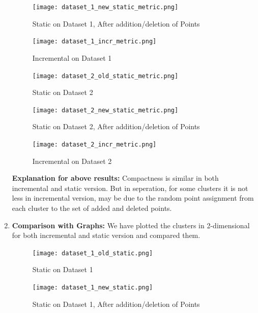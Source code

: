 \documentclass[acmsmall]{acmart}
\begin{document}
\begin{enumerate}
        \begin{figure} [H]
            \texttt{[image: dataset\_1\_new\_static\_metric.png]}
            \caption{Static on Dataset 1, After addition/deletion of Points} 
        \end{figure}
                    
        \begin{figure} [H]
            \texttt{[image: dataset\_1\_incr\_metric.png]}
            \caption{Incremental on Dataset 1} 
        \end{figure}
                    
        \begin{figure} [H]
            \texttt{[image: dataset\_2\_old\_static\_metric.png]}
            \caption{Static on Dataset 2} 
        \end{figure}
                    
        \begin{figure} [H]
            \texttt{[image: dataset\_2\_new\_static\_metric.png]}
            \caption{Static on Dataset 2, After addition/deletion of Points} 
        \end{figure}
        
        \begin{figure} [H]
            \texttt{[image: dataset\_2\_incr\_metric.png]}
            \caption{Incremental on Dataset 2} 
        \end{figure}
                    
        \textbf{Explanation for above results: } Compactness is similar in both incremental and static version. But in seperation, for some clusters it is not less in incremental version, may be due to the random point assignment from each cluster to the set of added and deleted points. 
        \vspace{2pt}
            
        \item \textbf{Comparison with Graphs: }We have plotted the clusters in 2-dimensional for both incremental and static version and compared them.
        \vspace{-20mm}
            \begin{figure} [H]
                \texttt{[image: dataset\_1\_old\_static.png]}
                \caption{Static on Dataset 1} 
            \end{figure}
                    
            \begin{figure} [H]
                \texttt{[image: dataset\_1\_new\_static.png]}
                \caption{Static on Dataset 1, After addition/deletion of Points} 
            \end{figure}
            

\end{enumerate}
\end{document}
